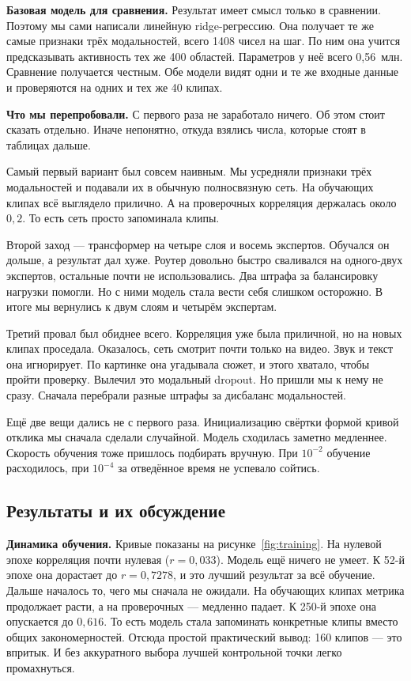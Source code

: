 \documentclass[12pt,a4paper]{article}
\begin{document}
\textbf{Базовая модель для сравнения.} Результат имеет смысл только в
сравнении. Поэтому мы сами написали линейную ridge-регрессию. Она
получает те же самые признаки трёх модальностей, всего 1408 чисел на
шаг. По ним она учится предсказывать активность тех же 400 областей.
Параметров у неё всего 0{,}56~млн. Сравнение получается честным. Обе
модели видят одни и те же входные данные и проверяются на одних и тех
же 40 клипах.

\textbf{Что мы перепробовали.} С первого раза не заработало ничего. Об
этом стоит сказать отдельно. Иначе непонятно, откуда взялись числа,
которые стоят в таблицах дальше.

Самый первый вариант был совсем наивным. Мы усредняли признаки трёх
модальностей и подавали их в обычную полносвязную сеть. На обучающих
клипах всё выглядело прилично. А на проверочных корреляция держалась
около $0{,}2$. То есть сеть просто запоминала клипы.

Второй заход — трансформер на четыре слоя и восемь экспертов. Обучался
он дольше, а результат дал хуже. Роутер довольно быстро сваливался на
одного-двух экспертов, остальные почти не использовались. Два штрафа за
балансировку нагрузки помогли. Но с ними модель стала вести себя
слишком осторожно. В итоге мы вернулись к двум слоям и четырём
экспертам.

Третий провал был обиднее всего. Корреляция уже была приличной, но на
новых клипах проседала. Оказалось, сеть смотрит почти только на видео.
Звук и текст она игнорирует. По картинке она угадывала сюжет, и этого
хватало, чтобы пройти проверку. Вылечил это модальный dropout. Но
пришли мы к нему не сразу. Сначала перебрали разные штрафы за дисбаланс
модальностей.

Ещё две вещи дались не с первого раза. Инициализацию свёртки формой
кривой отклика мы сначала сделали случайной. Модель сходилась заметно
медленнее. Скорость обучения тоже пришлось подбирать вручную. При
$10^{-2}$ обучение расходилось, при $10^{-4}$ за отведённое время не
успевало сойтись.

\subsection{Результаты и их обсуждение}

\textbf{Динамика обучения.} Кривые показаны на
рисунке~\ref{fig:training}. На нулевой эпохе корреляция почти нулевая
($r = 0{,}033$). Модель ещё ничего не умеет. К 52-й эпохе она
дорастает до $r = 0{,}7278$, и это лучший результат за всё обучение.
Дальше началось то, чего мы сначала не ожидали. На обучающих клипах
метрика продолжает расти, а на проверочных — медленно падает. К 250-й
эпохе она опускается до $0{,}616$. То есть модель стала запоминать
конкретные клипы вместо общих закономерностей. Отсюда простой
практический вывод: 160 клипов — это впритык. И без аккуратного выбора
лучшей контрольной точки легко промахнуться.
\end{document}
